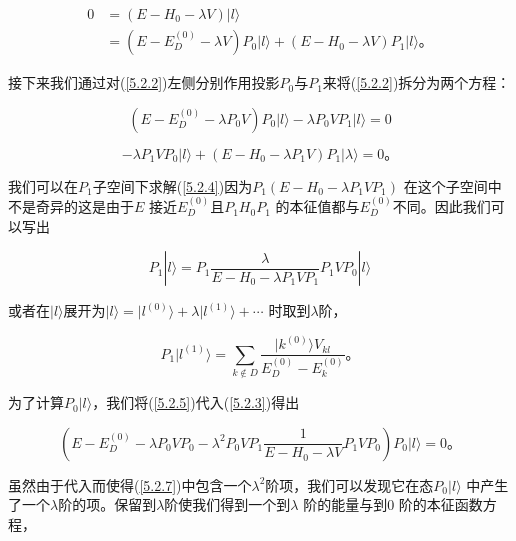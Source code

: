 ﻿\documentclass[UTF8,twoside]{ctexart}
\begin{document}
\begin{equation} \label{5.2.2}
\begin{split}
0 &= (E - H_0 - \lambda V)|l\rangle \\
&= (E - E_D^{(0)} - \lambda V) P_0 |l\rangle + (E - H_0 - \lambda V) P_1 |l\rangle\text{。}
\end{split}
\end{equation}

\noindent  接下来我们通过对(\ref{5.2.2})左侧分别作用投影$P_0$与$P_1$来将(\ref{5.2.2})拆分为两个方程：

\begin{equation} \label{5.2.3}
(E-E_D^{(0)}-\lambda P_0 V)P_0|l\rangle - \lambda P_0 V P_1|l\rangle=0
\end{equation}

\begin{equation} \label{5.2.4}
-\lambda P_1 V P_0|l\rangle + (E-H_0-\lambda P_1 V) P_1 |\lambda\rangle=0\text{。}
\end{equation}

\noindent 我们可以在$P_1$子空间下求解(\ref{5.2.4})因为$P_1(E-H_0-\lambda P_1 V P_1)$ 在这个子空间中不是奇异的这是由于$E$ 接近$E_D^{(0)}$且$P_1 H_0 P_1$ 的本征值都与$E_D^{(0)}$不同。因此我们可以写出

\begin{equation} \label{5.2.5}
P_1 |l\rangle = P_1 \dfrac{\lambda}{E-H_0-\lambda P_1 V P_1}P_1 V P_0|l\rangle
\end{equation}

\noindent 或者在$|l\rangle$展开为$|l\rangle = |l^{(0)}\rangle + \lambda|l^{(1)}\rangle +\cdots$ 时取到$\lambda$阶，

\begin{equation} \label{5.2.6}
P_1 |l^{(1)}\rangle = \displaystyle\sum_{k\not\in D}\dfrac{|k^{(0)}\rangle V_{kl}}{E_D^{(0)}-E_k^{(0)}}\text{。}
\end{equation}

为了计算$P_0|l\rangle$，我们将(\ref{5.2.5})代入(\ref{5.2.3})得出

\begin{equation} \label{5.2.7}
(E-E_D^{(0)}-\lambda P_0 V P_0 - \lambda^2 P_0 V P_1\dfrac{1}{E-H_0-\lambda V}P_1 V P_0)P_0 |l\rangle = 0\text{。}
\end{equation}

\noindent 虽然由于代入而使得(\ref{5.2.7})中包含一个$\lambda^2$阶项，我们可以发现它在态$P_0|l\rangle$ 中产生了一个$\lambda$阶的项。保留到$\lambda$阶使我们得到一个到$\lambda$ 阶的能量与到0 阶的本征函数方程，
\end{document}
